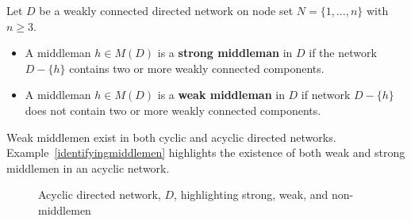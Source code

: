 \begin{definition} \label{strongweakmiddlemen}
Let $D$ be a weakly connected directed network on node set $N = \{ 1, \ldots ,n \}$ with $n \geqslant 3$.
\begin{itemize}
\item A middleman $h \in M(D)$ is a \textbf{strong middleman} in $D$ if the network $D - \{h\}$ contains two or more weakly connected components.

\item A middleman $h \in M(D)$ is a \textbf{weak middleman} in $D$ if network $D - \{h\}$ does not contain two or more weakly connected components.
\end{itemize}
\end{definition}

Weak middlemen exist in both cyclic and acyclic directed networks. Example~\ref{identifyingmiddlemen} highlights the existence of both weak and strong middlemen in an acyclic network.

\begin{figure}[t]
\begin{center}
\end{center}
\caption[Acyclic directed network highlighting strong, weak, and non-middlemen]{Acyclic directed network, $D$, highlighting strong, weak, and non-middlemen}
\label{weakmm}
\end{figure}


